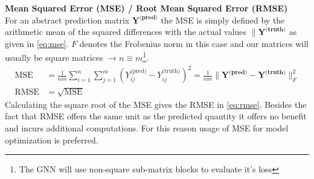 \textbf{Mean Squared Error (MSE) / Root Mean Squared Error (RMSE)}\\
For an abstract prediction matrix $\mathbf{Y^\text{(pred)}}$ the MSE is simply defined by the arithmetic mean of the squared differences with the actual values $\|\mathbf{Y^\text{(truth)}}$ as given in \autoref{eq:mse}. $F$ denotes the Frobenius norm in this case and our matrices will usually be square matrices $\rightarrow n \equiv m$\footnote{The GNN will use non-square sub-matrix blocks to evaluate it's loss}.  
\begin{subequations}
\begin{align}
\text{MSE} &= \frac{1}{nm} \sum_{i=1}^{n} \sum_{j=1}^{m} \left( Y^\text{(pred)}_{ij} - Y^\text{(truth)}_{ij} \right)^2 = \frac{1}{nm} \|\mathbf{Y^\text{(pred)}} - \mathbf{Y^\text{(truth)}}\|_F^2 \label{eq:mse}\\
\text{RMSE} &= \sqrt{ \text{MSE}}\label{eq:rmse}
\end{align}
\end{subequations}
Calculating the square root of the MSE gives the RMSE in \autoref{eq:rmse}. Besides the fact that RMSE offers the same unit as the predicted quantity it offers no benefit and incurs additional computations. For this reason usage of MSE for model optimization is preferred. 
